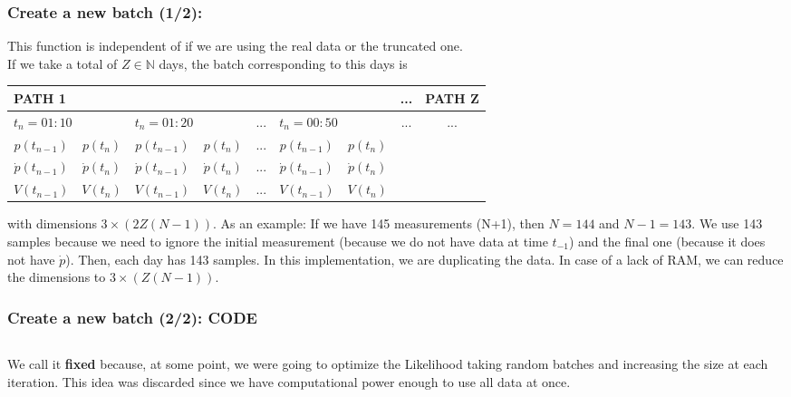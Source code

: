 \documentclass[aspectratio=169]{beamer}\usepackage[utf8]{inputenc}
\newcommand{\N}{\mathbb{N}}
\begin{document}
\begin{frame}\frametitle{Create a new batch (1/2):} \label{cre_batch}

\alert{This function is independent of if we are using the real data or the truncated one.}\\
If we take a total of $Z\in\N$ days, the batch corresponding to this days is
\begin{table}[]
\begin{tabular}{|c|c|c|c|c|c|c|c|c|}
\hline
\multicolumn{7}{|l|}{PATH 1}                                                                                       & ...                  & PATH Z               \\ \hline
\multicolumn{2}{|l|}{$t_n=01:10$}   & \multicolumn{2}{l|}{$t_n=01:20$}    & ... & \multicolumn{2}{l|}{$t_n=00:50$} & \multirow{4}{*}{...} & \multirow{4}{*}{...} \\ \cline{1-7}
$p(t_{n-1})$      & $p(t_{n})$      & $p(t_{n-1})$      & $p(t_{n})$      & ... & $p(t_{n-1})$     & $p(t_{n})$    &                      &                      \\ \cline{1-7}
$\dot{p}(t_{n-1})$ & $\dot{p}(t_{n})$ & $\dot{p}(t_{n-1})$ & $\dot{p}(t_{n})$ & ... & $\dot{p}(t_{n-1})$     & $\dot{p}(t_{n})$    &                      &                      \\ \cline{1-7}

$V(t_{n-1})$      & $V(t_{n})$      & $V(t_{n-1})$      & $V(t_{n})$      & ... & $V(t_{n-1})$     & $V(t_{n})$    &                      &                      \\ \hline
\end{tabular}
\end{table}
with dimensions $3\times(2Z(N-1))$. As an example: If we have 145 measurements (N+1), then $N=144$ and $N-1=143$. We use 143 samples because we need to ignore the initial measurement (because we do not have data at time $t_{-1}$) and the final one (because it does not have $\dot{p}$). Then, each day has 143 samples. In this implementation, we are duplicating the data. In case of a lack of RAM, we can reduce the dimensions to $3\times(Z(N-1))$.
\end{frame}


\begin{frame}\frametitle{Create a new batch (2/2): CODE}

\begin{center}
\begin{tabular}{|c|}
\toprule
{\tiny

}\\
\bottomrule
\end{tabular}
\end{center}
We call it \textbf{fixed} because, at some point, we were going to optimize the Likelihood taking random batches and increasing the size at each iteration. This idea was discarded since we have computational power enough to use all data at once.
\end{frame}
\end{document}
